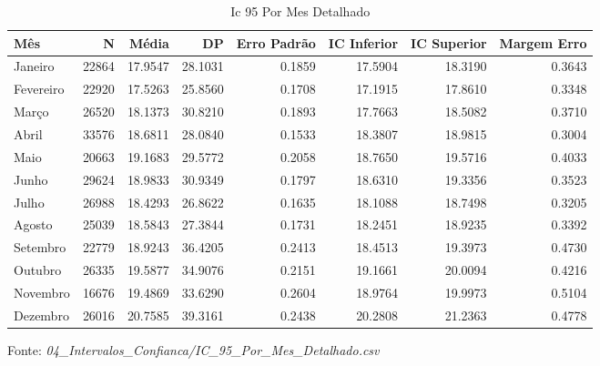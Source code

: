 \begin{table}[H]
\centering
\small
\caption{Ic 95 Por Mes Detalhado}
\label{tab:06_04_Intervalos_Confianca}
\begin{tabular}{|l|r|r|r|r|r|r|r|}
\hline
\textbf{Mês} & \textbf{N} & \textbf{Média} & \textbf{DP} & \textbf{Erro Padrão} & \textbf{IC Inferior} & \textbf{IC Superior} & \textbf{Margem Erro} \\
\hline
Janeiro & 22864 & 17.9547 & 28.1031 & 0.1859 & 17.5904 & 18.3190 & 0.3643 \\
Fevereiro & 22920 & 17.5263 & 25.8560 & 0.1708 & 17.1915 & 17.8610 & 0.3348 \\
Março & 26520 & 18.1373 & 30.8210 & 0.1893 & 17.7663 & 18.5082 & 0.3710 \\
Abril & 33576 & 18.6811 & 28.0840 & 0.1533 & 18.3807 & 18.9815 & 0.3004 \\
Maio & 20663 & 19.1683 & 29.5772 & 0.2058 & 18.7650 & 19.5716 & 0.4033 \\
Junho & 29624 & 18.9833 & 30.9349 & 0.1797 & 18.6310 & 19.3356 & 0.3523 \\
Julho & 26988 & 18.4293 & 26.8622 & 0.1635 & 18.1088 & 18.7498 & 0.3205 \\
Agosto & 25039 & 18.5843 & 27.3844 & 0.1731 & 18.2451 & 18.9235 & 0.3392 \\
Setembro & 22779 & 18.9243 & 36.4205 & 0.2413 & 18.4513 & 19.3973 & 0.4730 \\
Outubro & 26335 & 19.5877 & 34.9076 & 0.2151 & 19.1661 & 20.0094 & 0.4216 \\
Novembro & 16676 & 19.4869 & 33.6290 & 0.2604 & 18.9764 & 19.9973 & 0.5104 \\
Dezembro & 26016 & 20.7585 & 39.3161 & 0.2438 & 20.2808 & 21.2363 & 0.4778 \\
\hline
\end{tabular}
\begin{flushleft}
\small Fonte: \textit{04_Intervalos_Confianca/IC_95_Por_Mes_Detalhado.csv}
\end{flushleft}
\end{table}
